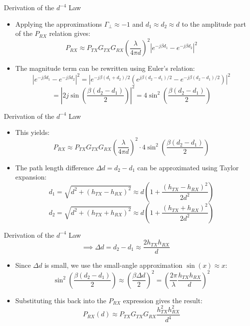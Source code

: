 \documentclass{beamer}
\begin{document}
	\begin{frame}{Derivation of the $d^{-4}$ Law}
		\begin{itemize}
			\item Applying the approximations $\Gamma_{\perp} \approx -1$ and $d_1 \approx d_2 \approx d$ to the amplitude part of the $P_{RX}$ relation gives:
			\[ P_{RX} \approx P_{TX} G_{TX} G_{RX} \left( \frac{\lambda}{4\pi d} \right)^2 \left| e^{-j\beta d_1} - e^{-j\beta d_2} \right|^2 \]
			\item The magnitude term can be rewritten using Euler's relation:
			\[ |e^{-j\beta d_1} - e^{-j\beta d_2}|^2 = |e^{-j\beta (d_1+d_2)/2}(e^{j\beta (d_2-d_1)/2} - e^{-j\beta (d_2-d_1)/2})|^2 \]
			\[ = |2j \sin\left(\frac{\beta(d_2-d_1)}{2}\right)|^2 = 4\sin^2\left(\frac{\beta(d_2-d_1)}{2}\right) \]
			
		\end{itemize}
	\end{frame}
	
	\begin{frame}{Derivation of the $d^{-4}$ Law}
		\begin{itemize}
			\item This yields:
			\[ P_{RX} \approx P_{TX} G_{TX} G_{RX} \left( \frac{\lambda}{4\pi d} \right)^2 \cdot 4\sin^2\left(\frac{\beta(d_2-d_1)}{2}\right) \]
			
			\item The path length difference $\Delta d = d_2 - d_1$ can be approximated using Taylor expansion:
			\[ d_1 = \sqrt{d^2 + (h_{TX}-h_{RX})^2} \approx d \left(1 + \frac{(h_{TX}-h_{RX})^2}{2d^2}\right) \]
			\[ d_2 = \sqrt{d^2 + (h_{TX}+h_{RX})^2} \approx d \left(1 + \frac{(h_{TX}+h_{RX})^2}{2d^2}\right) \]
			
		\end{itemize}
	\end{frame}
	
	\begin{frame}{Derivation of the $d^{-4}$ Law}
		\[ \implies \Delta d = d_2 - d_1 \approx \frac{2 h_{TX} h_{RX}}{d} \]
		\begin{itemize}
			
			\item Since $\Delta d$ is small, we use the small-angle approximation $\sin(x) \approx x$:
			\[ \sin^2\left(\frac{\beta(d_2-d_1)}{2}\right) \approx \left(\frac{\beta \Delta d}{2}\right)^2 = \left(\frac{2\pi}{\lambda} \frac{h_{TX}h_{RX}}{d}\right)^2 \]
			\item Substituting this back into the $P_{RX}$ expression gives the result:
			\[ P_{RX}(d) \approx P_{TX} G_{TX} G_{RX} \frac{h_{TX}^2 h_{RX}^2}{d^4} \]
		\end{itemize}
	\end{frame}
	
\end{document}
